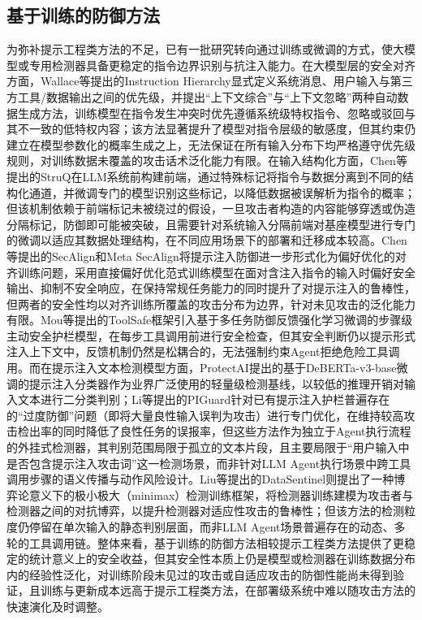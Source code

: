 \subsection{基于训练的防御方法}

为弥补提示工程类方法的不足，已有一批研究转向通过训练或微调的方式，使大模型或专用检测器具备更稳定的指令边界识别与抗注入能力。在大模型层的安全对齐方面，Wallace等\cite{wallace2024instruction}提出的Instruction Hierarchy显式定义系统消息、用户输入与第三方工具/数据输出之间的优先级，并提出“上下文综合”与“上下文忽略”两种自动数据生成方法，训练模型在指令发生冲突时优先遵循系统级特权指令、忽略或驳回与其不一致的低特权内容；该方法显著提升了模型对指令层级的敏感度，但其约束仍建立在模型参数化的概率生成之上，无法保证在所有输入分布下均严格遵守优先级规则，对训练数据未覆盖的攻击话术泛化能力有限。在输入结构化方面，Chen等\cite{chen2025struq}提出的StruQ在LLM系统前构建前端，通过特殊标记将指令与数据分离到不同的结构化通道，并微调专门的模型识别这些标记，以降低数据被误解析为指令的概率；但该机制依赖于前端标记未被绕过的假设，一旦攻击者构造的内容能够穿透或伪造分隔标记，防御即可能被突破，且需要针对系统输入分隔前端对基座模型进行专门的微调以适应其数据处理结构，在不同应用场景下的部署和迁移成本较高。Chen等提出的SecAlign\cite{chen2025secalign}和Meta SecAlign\cite{chen2025metasecalign}将提示注入防御进一步形式化为偏好优化的对齐训练问题，采用直接偏好优化范式训练模型在面对含注入指令的输入时偏好安全输出、抑制不安全响应，在保持常规任务能力的同时提升了对提示注入的鲁棒性，但两者的安全性均以对齐训练所覆盖的攻击分布为边界，针对未见攻击的泛化能力有限。Mou等\cite{mou2026toolsafe}提出的ToolSafe框架引入基于多任务防御反馈强化学习微调的步骤级主动安全护栏模型，在每步工具调用前进行安全检查，但其安全判断仍以提示形式注入上下文中，反馈机制仍然是松耦合的，无法强制约束Agent拒绝危险工具调用。而在提示注入文本检测模型方面，ProtectAI\cite{protectai2024}提出的基于DeBERTa-v3-base微调的提示注入分类器作为业界广泛使用的轻量级检测基线，以较低的推理开销对输入文本进行二分类判别；Li等\cite{li2025piguard}提出的PIGuard针对已有提示注入护栏普遍存在的“过度防御”问题（即将大量良性输入误判为攻击）进行专门优化，在维持较高攻击检出率的同时降低了良性任务的误报率，但这些方法作为独立于Agent执行流程的外挂式检测器，其判别范围局限于孤立的文本片段，且主要局限于“用户输入中是否包含提示注入攻击词”这一检测场景，而非针对LLM Agent执行场景中跨工具调用步骤的语义传播与动作风险设计。Liu等\cite{liu2025datasentinel}提出的DataSentinel则提出了一种博弈论意义下的极小极大（minimax）检测训练框架，将检测器训练建模为攻击者与检测器之间的对抗博弈，以提升检测器对适应性攻击的鲁棒性；但该方法的检测粒度仍停留在单次输入的静态判别层面，而非LLM Agent场景普遍存在的动态、多轮的工具调用链。整体来看，基于训练的防御方法相较提示工程类方法提供了更稳定的统计意义上的安全收益，但其安全性本质上仍是模型或检测器在训练数据分布内的经验性泛化，对训练阶段未见过的攻击或自适应攻击的防御性能尚未得到验证，且训练与更新成本远高于提示工程类方法，在部署级系统中难以随攻击方法的快速演化及时调整。

